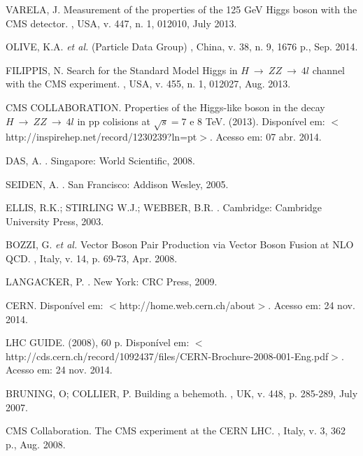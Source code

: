 \begin{thebibliography}{}
VARELA, J.
\newblock Measurement of the properties of the 125 GeV Higgs boson with the CMS detector.
, USA, v. 447, n. 1, 012010, July 2013.

OLIVE, K.A. \textit{et al.} (Particle Data Group)
, China, v. 38, n. 9, 1676 p., Sep. 2014.

FILIPPIS, N.
\newblock Search for the Standard Model Higgs in $H~\rightarrow~ZZ~\rightarrow~4l$ channel with the CMS experiment.
, USA, v. 455, n. 1, 012027, Aug. 2013.

CMS COLLABORATION.
\newblock Properties of the Higgs-like boson in the decay $H~\rightarrow~ZZ~\rightarrow~4l$ in pp colisions at $\sqrt{s}=7$ e 8 TeV.
 (2013). Disponível em: $<$http://inspirehep.net/record/1230239?ln=pt$>$. Acesso em: 07 abr. 2014.

DAS, A.
.
\newblock Singapore: World Scientific, 2008.

SEIDEN, A.
.
\newblock San Francisco: Addison Wesley, 2005.

ELLIS, R.K.; STIRLING W.J.; WEBBER, B.R.
.
\newblock Cambridge: Cambridge University Press, 2003.

BOZZI, G. \textit{et al.}
\newblock Vector Boson Pair Production via Vector Boson Fusion at NLO QCD.
, Italy, v. 14, p. 69-73, Apr. 2008.

LANGACKER, P.
.
\newblock New York: CRC Press, 2009.

CERN.
\newblock Disponível em: $<$http://home.web.cern.ch/about$>$. Acesso em: 24 nov. 2014.

LHC GUIDE.
 (2008), 60 p.
\newblock Disponível em: $<$http://cds.cern.ch/record/1092437/files/CERN-Brochure-2008-001-Eng.pdf$>$. Acesso em: 24 nov. 2014.

BRUNING, O; COLLIER, P.
\newblock Building a behemoth.
, UK, v. 448, p. 285-289, July 2007.

CMS Collaboration.
\newblock The CMS experiment at the CERN LHC.
, Italy, v. 3, 362 p., Aug. 2008.


\end{thebibliography}
